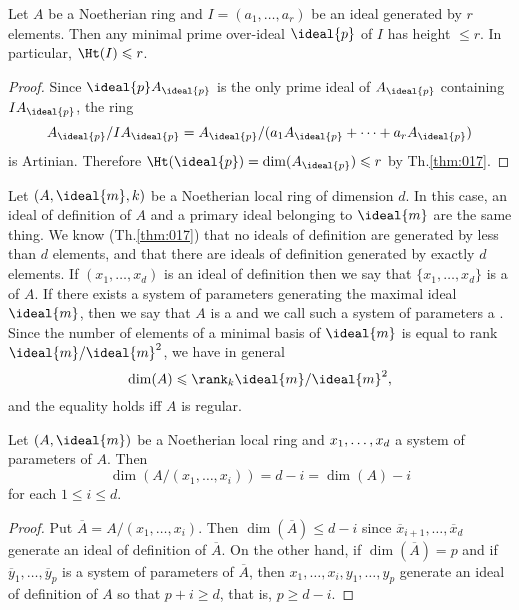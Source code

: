 \documentclass[../main]{subfiles}
\begin{document}
\begin{partheorem}\label{thm:018}
Let $A$ be a Noetherian ring and $I=(a_1, \ldots, a_r)$ be an ideal generated by $r$ elements. Then any minimal prime over-ideal $\ideal{p}$ of $I$ has height $\leqslant r$. In particular, $\Ht(I)\leqslant r$.
\end{partheorem}

\begin{proof}
Since $\ideal{p}A_{\ideal{p}}$ is the only prime ideal of $A_{\ideal{p}}$ containing $IA_{\ideal{p}}$, the ring \[A_{\ideal{p}}/IA_{\ideal{p}}=A_{\ideal{p}} /(a_1 A_{\ideal{p}}+\cdots+a_r A_{\ideal{p}})\] is Artinian. Therefore $\Ht(\ideal{p})=\dim(A_{\ideal{p}}) \leqslant r$ by Th.\ref{thm:017}.
\end{proof} 

\newparagraph Let $(A, \ideal{m}, k)$ be a Noetherian local ring of dimension $d$. In this case, an ideal of definition of $A$ and a primary ideal belonging to $\ideal{m}$ are the same thing. We know (Th.\ref{thm:017}) that no ideals of definition are generated by less than $d$ elements, and that there are ideals of definition generated by exactly $d$ elements. If $(x_1, \ldots, x_d)$ is an ideal of definition then we say that $\{x_1, \ldots, x_d\}$ is a  of $A$. If there exists a system of parameters generating the maximal ideal $\ideal{m}$, then we say that $A$ is a  and we call such a system of parameters a . Since the number of elements of a minimal basis of $\ideal{m}$ is equal to rank $\ideal{m} / \ideal{m}^2$, we have in general \[\dim(A) \leqslant\rank_k\ideal{m} / \ideal{m}^2,\] and the equality holds iff $A$ is regular.

\begin{parproposition}\label{pro:12.02}
Let $(A, \ideal{m})$ be a Noetherian local ring and $x_1, \ldots,\linebreak x_d$ a system of parameters of $A$. Then \[\dim(A/(x_1, \ldots, x_i))=d-i=\dim(A)-i\] for each $1 \leqslant i \leqslant d$.
\end{parproposition}

\begin{proof}
Put $\overline{A}=A/(x_1, \ldots, x_i)$. Then $\dim(\overline{A}) \leqslant d-i$ since $\overline{x}_{i+1}, \ldots, \overline{x}_d$ generate an ideal of definition of $\overline{A}$. On the other hand, if $\dim(\overline{A})=p$ and if $\overline{y}_1, \ldots, \overline{y}_p$ is a system of parameters of $\overline{A}$, then $x_1, \ldots, x_i, y_1, \ldots, y_p$ generate an ideal of definition of $A$ so that $p+i \geqslant d$, that is, $p \geqslant d-i$.
\end{proof}
\end{document}
